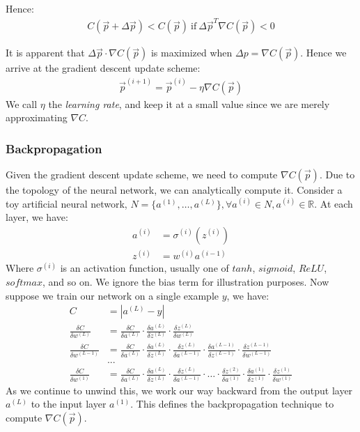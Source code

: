 \documentclass[paper=a4, fontsize=12pt]{scrartcl} %
\numberwithin{equation}{section} %
\numberwithin{figure}{section} %
\numberwithin{table}{section} %
\begin{document}
Hence:
\begin{align*}
    C(\vec{p} + \Delta \vec{p}) < C(\vec{p}) \mathrm{\ if\ } \Delta \vec{p}^T \nabla C(\vec{p}) < 0
\end{align*}

It is apparent that $\Delta \vec{p} \cdot \nabla C(\vec{p})$ is maximized when $\Delta p = \nabla C(\vec{p})$. Hence we arrive at the 
gradient descent update scheme:
\begin{align*}
    \vec{p}^{(i+1)} = \vec{p}^{(i)} - \eta \nabla C(\vec{p})
\end{align*}
We call $\eta$ the \textit{learning rate}, and keep it at a small value since we are merely approximating $\nabla C$.

\pagebreak

\subsubsection{Backpropagation}

Given the gradient descent update scheme, we need to compute $\nabla C(\vec{p})$. Due to the topology of the neural network, we can analytically compute it. Consider a toy artificial neural network,
$N = \{a^{(1)}, \ldots, a^{(L)} \}, \forall a^{(i)} \in N, a^{(i)} \in \mathbb{R}$. At each layer, we have:
\begin{align*}
    a^{(i)} &= \sigma^{(i)} (z^{(i)}) \\
    z^{(i)} &= w^{(i)} a^{(i - 1)}
\end{align*}
Where $\sigma^{(i)}$ is an activation function, usually one of $tanh$, $sigmoid$, $ReLU$, $softmax$, and so on. We ignore the bias term for illustration purposes. Now suppose we train our network on a single example $y$, we have:
\begin{align*}
    C &= | a^{(L)} - y | \\
    \frac{\delta C}{\delta w^{(L)}} &= \frac{\delta C}{\delta a^{(L)}} \cdot \frac{\delta a^{(L)}}{\delta z^{(L)}} \cdot \frac{\delta z^{(L)}}{\delta w^{(L)}} \\
    \frac{\delta C}{\delta w^{(L - 1)}} &= \frac{\delta C}{\delta a^{(L)}} \cdot \frac{\delta a^{(L)}}{\delta z^{(L)}} \cdot \frac{\delta z^{(L)}}{\delta a^{(L - 1)}} \cdot \frac{\delta a^{(L - 1)}}{\delta z^{(L - 1)}} \cdot \frac{\delta z^{(L - 1)}}{\delta w^{(L - 1)}} \\
    &... \\
    \frac{\delta C}{\delta w^{(1)}} &= \frac{\delta C}{\delta a^{(L)}} \cdot \frac{\delta a^{(L)}}{\delta z^{(L)}} \cdot \frac{\delta z^{(L)}}{\delta a^{(L - 1)}} \cdot \ldots \cdot \frac{\delta z^{(2)}}{\delta a^{(1)}} \cdot \frac{\delta a^{(1)}}{\delta z^{(1)}} \cdot \frac{\delta z^{(1)}}{\delta w^{(1)}}
\end{align*}
As we continue to unwind this, we work our way backward from the output layer $a^{(L)}$ to the input layer $a^{(1)}$. This defines the backpropagation technique to compute $\nabla C(\vec{p})$.
\end{document}
